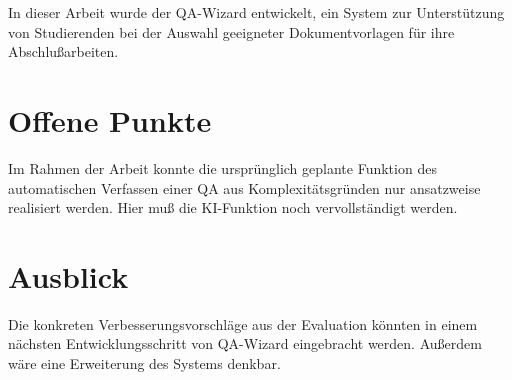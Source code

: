 \documentclass[11pt,        %
  english,ngerman,          %
  paper=a4,                 %
  captions=tablesignature,  %
  listof=numbered,          %
  bibliography=totoc,       %
  headings=small,           %
  headinclude=false,        %
  footinclude=false,        %
  parskip=half-,            %
  oneside,                  %
  BCOR=15mm,                 %
  DIV=12                    %
  ]{scrbook}                %
\begin{document}

In dieser Arbeit wurde der QA-Wizard entwickelt, ein System zur Unterstützung von Studierenden bei
der Auswahl geeigneter Dokumentvorlagen für ihre Abschlußarbeiten.

\section{Offene Punkte}\label{sec:conc_open_questions}


Im Rahmen der Arbeit konnte die ursprünglich geplante Funktion des automatischen Verfassen einer QA aus Komplexitätsgründen nur ansatzweise realisiert werden. Hier muß die KI-Funktion noch vervollständigt werden.

\section{Ausblick}\label{sec:conc_outlook}


Die konkreten Verbesserungsvorschläge aus der Evaluation könnten in einem nächsten  Entwicklungsschritt von QA-Wizard eingebracht werden. Außerdem wäre eine Erweiterung des Systems denkbar.



\backmatter

  \cleardoublepage
  \listoffigures

  \cleardoublepage
  \listoftables

  \cleardoublepage
  \lstlistoflistings  %
\end{document}

